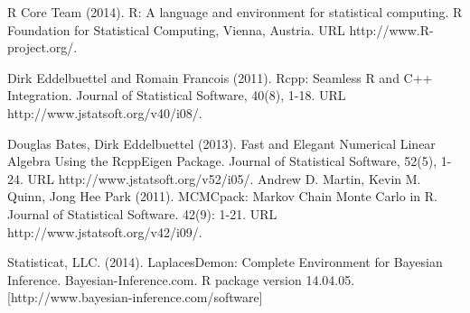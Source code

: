 \documentclass[english]{report}
\begin{document}
\newpage
{}
%
%
\begin{thebibliography}{9}

R Core Team (2014). R: A language and environment for statistical computing. R Foundation for
  Statistical Computing, Vienna, Austria. URL http://www.R-project.org/.
  
 Dirk Eddelbuettel and Romain Francois (2011). Rcpp: Seamless R and C++ Integration. Journal of
  Statistical Software, 40(8), 1-18. URL http://www.jstatsoft.org/v40/i08/.

Douglas Bates, Dirk Eddelbuettel (2013). Fast and Elegant Numerical Linear Algebra Using the
  RcppEigen Package. Journal of Statistical Software, 52(5), 1-24. URL
  http://www.jstatsoft.org/v52/i05/.
Andrew D. Martin, Kevin M. Quinn, Jong Hee Park (2011). MCMCpack: Markov Chain Monte Carlo in R.
  Journal of Statistical Software. 42(9): 1-21. URL http://www.jstatsoft.org/v42/i09/. 
 
Statisticat, LLC. (2014). LaplacesDemon: Complete Environment for
  Bayesian Inference. Bayesian-Inference.com. R package version
  14.04.05. [http://www.bayesian-inference.com/software] 
 
 \end{thebibliography}
\end{document}
